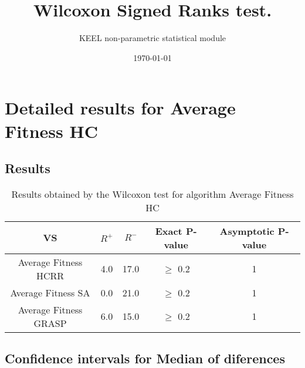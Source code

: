 \documentclass[a4paper,10pt]{article}
\title{Wilcoxon Signed Ranks test.}
\date{\today}
\author{KEEL non-parametric statistical module}
\begin{document}
\pagestyle{empty}
\maketitle
\thispagestyle{empty}



\section{Detailed results for Average Fitness HC    }


\subsection{Results}

\begin{table}[!htp]
\centering\small
\begin{tabular}{
|c|c|c|c|c|}
\hline
 VS & $R^{+}$ & $R^{-}$ & Exact P-value & Asymptotic P-value \\ \hline 
Average Fitness HCRR    & 4.0 & 17.0 & $\geq$ 0.2 & 1\\ \hline 
Average Fitness SA   & 0.0 & 21.0 & $\geq$ 0.2 & 1\\ \hline 
Average Fitness GRASP & 6.0 & 15.0 & $\geq$ 0.2 & 1\\ \hline 

\end{tabular}
\caption{Results obtained by the Wilcoxon test for algorithm Average Fitness HC    }
\end{table}

\subsection{Confidence intervals for Median of diferences}
\end{document}
